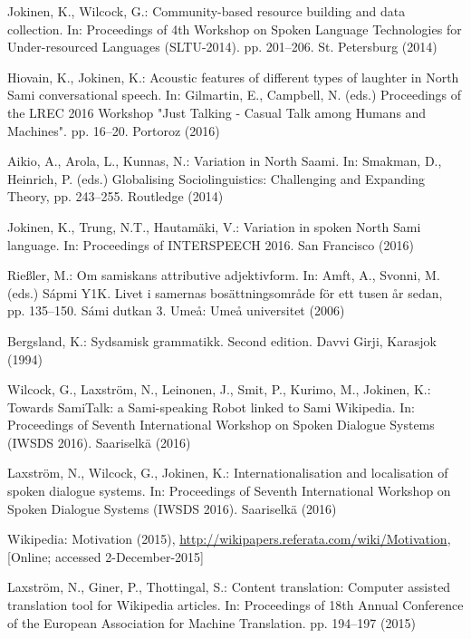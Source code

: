 \documentclass[runningheads,a4paper]{llncs}
\begin{document}
\begin{thebibliography}{10}
Jokinen, K., Wilcock, G.: Community-based resource building and data
  collection. In: Proceedings of 4th Workshop on Spoken Language Technologies
  for Under-resourced Languages (SLTU-2014). pp. 201--206. St. Petersburg
  (2014)

Hiovain, K., Jokinen, K.: Acoustic features of different types of laughter in
  {North Sami} conversational speech. In: Gilmartin, E., Campbell, N. (eds.)
  Proceedings of the LREC 2016 Workshop "Just Talking - Casual Talk among
  Humans and Machines". pp. 16--20. Portoroz (2016)

Aikio, A., Arola, L., Kunnas, N.: Variation in {North Saami}. In: Smakman, D.,
  Heinrich, P. (eds.) Globalising Sociolinguistics: Challenging and Expanding
  Theory, pp. 243--255. Routledge (2014)

Jokinen, K., Trung, N.T., {Hautam\"aki}, V.: Variation in spoken {North Sami}
  language. In: Proceedings of INTERSPEECH 2016. San Francisco (2016)

Rie{\ss}ler, M.: Om samiskans attributive adjektivform. In: Amft, A., Svonni,
  M. (eds.) {S\'{a}pmi} Y1K. Livet i samernas {bos\"{a}ttningsomr\r{a}de}
  {f\"{o}r} ett tusen {\r{a}r} sedan, pp. 135--150. {S\'{a}mi} dutkan 3.
  {Ume\r{a}}: {Ume\r{a}} universitet (2006)

Bergsland, K.: Sydsamisk grammatikk. Second edition. {Davvi Girji}, Karasjok
  (1994)

Wilcock, G., {Laxstr\"om}, N., Leinonen, J., Smit, P., Kurimo, M., Jokinen, K.:
  {Towards SamiTalk: a Sami-speaking Robot linked to Sami Wikipedia}. In:
  Proceedings of Seventh International Workshop on Spoken Dialogue Systems
  (IWSDS 2016). Saariselk{\"a} (2016)

{Laxstr\"om}, N., Wilcock, G., Jokinen, K.: Internationalisation and
  localisation of spoken dialogue systems. In: Proceedings of Seventh
  International Workshop on Spoken Dialogue Systems (IWSDS 2016).
  Saariselk{\"a} (2016)

Wikipedia: Motivation (2015),
  \url{http://wikipapers.referata.com/wiki/Motivation}, [Online; accessed
  2-December-2015]

{Laxstr\"om}, N., Giner, P., Thottingal, S.: Content translation: Computer
  assisted translation tool for {Wikipedia} articles. In: Proceedings of 18th
  Annual Conference of the European Association for Machine Translation. pp.
  194--197 (2015)

\end{thebibliography}
\end{document}
